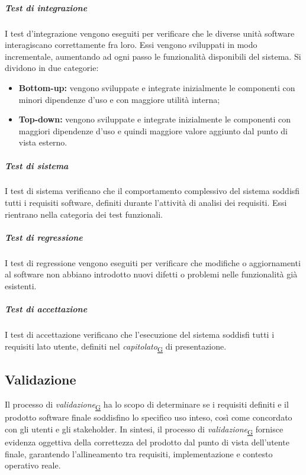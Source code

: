 \documentclass[a4paper,12pt]{article}
\begin{document}
                \subparagraph{Test di integrazione}\hfill\break
                    I test d'integrazione vengono eseguiti per verificare che le diverse unità software interagiscano correttamente fra loro.\newline
                    Essi vengono sviluppati in modo incrementale, aumentando ad ogni passo le funzionalità disponibili del sistema.
                    Si dividono in due categorie:
                    \begin{itemize}
                        \item \textbf{Bottom-up:} vengono sviluppate e integrate inizialmente le componenti con minori dipendenze d'uso e con maggiore utilità interna;
                        \item \textbf{Top-down:} vengono sviluppate e integrate inizialmente le componenti con maggiori dipendenze d'uso e quindi maggiore valore aggiunto dal punto di vista esterno.
                    \end{itemize}
                    
                \subparagraph{Test di sistema}\hfill\break
                    I test di sistema verificano che il comportamento complessivo del sistema soddisfi tutti i requisiti software, definiti durante l'attività di analisi dei requisiti. Essi rientrano nella categoria dei test funzionali.

                \subparagraph{Test di regressione}\hfill\break
                    I test di regressione vengono eseguiti per verificare che modifiche o aggiornamenti al software non abbiano introdotto nuovi difetti o problemi nelle funzionalità già esistenti.
                    
                \subparagraph{Test di accettazione}\hfill\break
                    I test di accettazione verificano che l'esecuzione del sistema soddisfi tutti i requisiti lato utente, definiti nel \textit{capitolato}\textsubscript{\href{https://atlasteam9.github.io/Atlas/glossario.html\#Capitolato}{G}} di presentazione.


    \subsection{Validazione}
       Il processo di \textit{validazione}\textsubscript{\href{https://atlasteam9.github.io/Atlas/glossario.html\#Validazione}{G}} ha lo scopo di determinare se i requisiti definiti e il prodotto software finale soddisfino lo specifico uso inteso, così come concordato con gli utenti e gli stakeholder. In sintesi, il processo di \textit{validazione}\textsubscript{\href{https://atlasteam9.github.io/Atlas/glossario.html\#Validazione}{G}} fornisce evidenza oggettiva della correttezza del prodotto dal punto di vista dell'utente finale, garantendo l'allineamento tra requisiti, implementazione e contesto operativo reale.
\end{document}
